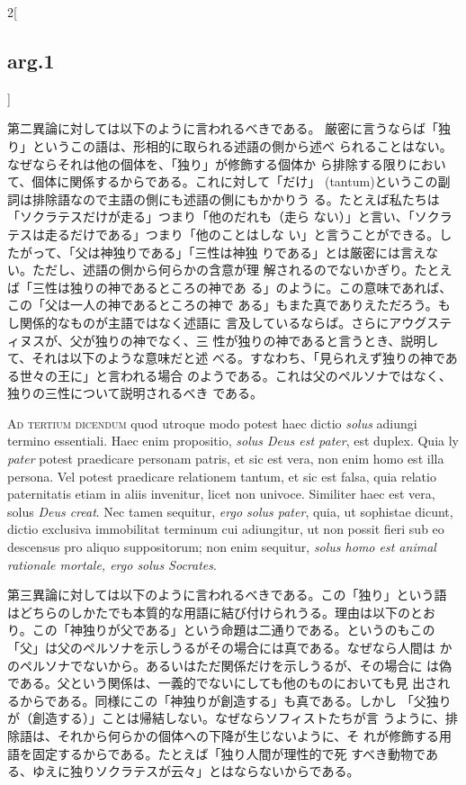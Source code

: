 \documentclass[paper=a4paper,fontsize=10pt,jafontsize=9pt,titlepage]{jlreq}
\begin{document}
\begin{paracol}{2}[\subsection{arg.1}]
\switchcolumn

第二異論に対しては以下のように言われるべきである。
厳密に言うならば「独り」というこの語は、形相的に取られる述語の側から述べ
られることはない。なぜならそれは他の個体を、「独り」が修飾する個体か
ら排除する限りにおいて、個体に関係するからである。これに対して「だけ」
 (tantum)というこの副詞は排除語なので主語の側にも述語の側にもかかりう
 る。たとえば私たちは「ソクラテスだけが走る」つまり「他のだれも（走ら
 ない）」と言い、「ソクラテスは走るだけである」つまり「他のことはしな
 い」と言うことができる。したがって、「父は神独りである」「三性は神独
 りである」とは厳密には言えない。ただし、述語の側から何らかの含意が理
 解されるのでないかぎり。たとえば「三性は独りの神であるところの神であ
 る」のように。この意味であれば、この「父は一人の神であるところの神で
 ある」もまた真でありえただろう。もし関係的なものが主語ではなく述語に
 言及しているならば。さらにアウグスティヌスが、父が独りの神でなく、三
 性が独りの神であると言うとき、説明して、それは以下のような意味だと述
 べる。すなわち、「見られえず独りの神である世々の王に」と言われる場合
 のようである。これは父のペルソナではなく、独りの三性について説明されるべき
 である。

\switchcolumn*[\subsection{ad.3}]

{\scshape Ad tertium dicendum} quod utroque modo potest haec dictio {\itshape solus} adiungi
 termino essentiali. Haec enim propositio, {\itshape solus Deus est pater}, est
 duplex. Quia ly {\itshape pater} potest praedicare personam patris, et sic est
 vera, non enim homo est illa persona. Vel potest praedicare
 relationem tantum, et sic est falsa, quia relatio paternitatis etiam
 in aliis invenitur, licet non univoce. Similiter haec est vera, solus
 {\itshape Deus creat}. Nec tamen sequitur, {\itshape ergo solus pater}, quia, ut sophistae
 dicunt, dictio exclusiva immobilitat terminum cui adiungitur, ut non
 possit fieri sub eo descensus pro aliquo suppositorum; non enim
 sequitur, {\itshape solus homo est animal rationale mortale, ergo solus
 Socrates}.

\switchcolumn

第三異論に対しては以下のように言われるべきである。この「独り」という語
 はどちらのしかたでも本質的な用語に結び付けられうる。理由は以下のとお
 り。この「神独りが父である」という命題は二通りである。というのもこの
 「父」は父のペルソナを示しうるがその場合には真である。なぜなら人間は
 かのペルソナでないから。あるいはただ関係だけを示しうるが、その場合に
 は偽である。父という関係は、一義的でないにしても他のものにおいても見
 出されるからである。同様にこの「神独りが創造する」も真である。しかし
 「父独りが（創造する）」ことは帰結しない。なぜならソフィストたちが言
 うように、排除語は、それから何らかの個体への下降が生じないように、そ
 れが修飾する用語を固定するからである。たとえば「独り人間が理性的で死
 すべき動物である、ゆえに独りソクラテスが云々」とはならないからである。

\end{paracol}
\newpage
\end{document}
